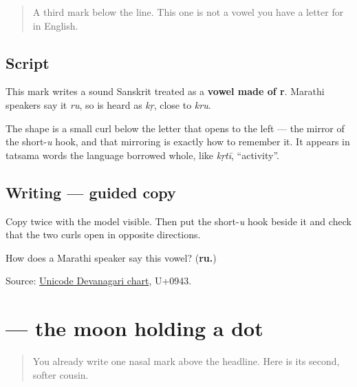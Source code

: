 \label{lesson:MR-W05-ru-matra}



\begin{quote}
A third mark below the line. This one is not a vowel you have a letter for in English.
\end{quote}

\subsection*{Script}
\begin{quote}
\end{quote}

This mark writes a sound Sanskrit treated as a \textbf{vowel made of r}. Marathi speakers say it \emph{ru}, so \textbf{} is heard as \emph{kṛ}, close to \emph{kru}.

The shape is a small curl below the letter that opens to the left — the mirror of the short-\emph{u} hook, and that mirroring is exactly how to remember it. It appears in tatsama words the language borrowed whole, like \emph{kṛtī}, \textquotedblleft{}activity\textquotedblright{}.

\subsection*{Writing — guided copy}

Copy \textbf{} twice with the model visible. Then put the short-\emph{u} hook beside it and check that the two curls open in opposite directions.

\begin{tcolorbox}[breakable,colback=teal!4,colframe=teal!35!black,title={Before you move on}]
How does a Marathi speaker say this vowel? (\textbf{ru.})

Source: \href{https://www.unicode.org/charts/PDF/U0900.pdf}{Unicode Devanagari chart}, U+0943.
\end{tcolorbox}
\section[\texorpdfstring{\mr{ँ} (ã)}{ँ (ã)}]{ — the moon holding a dot}

\label{lesson:MR-W05-candrabindu}



\begin{quote}
You already write one nasal mark above the headline. Here is its second, softer cousin.
\end{quote}

